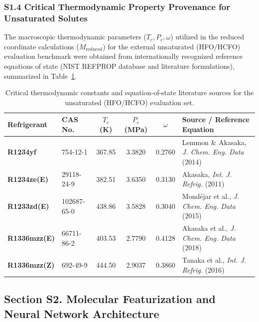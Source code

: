 \subsubsection*{S1.4 Critical Thermodynamic Property Provenance for Unsaturated Solutes}
The macroscopic thermodynamic parameters ($T_c, P_c, \omega$) utilized in the reduced coordinate calculations ($M_{\mathrm{reduced}}$) for the external unsaturated (HFO/HCFO) evaluation benchmark were obtained from internationally recognized reference equations of state (NIST REFPROP database and literature formulations), summarized in Table~\ref{tab:si_hfo_critical}.

\begin{table}[htbp]
\centering
\small
\caption{Critical thermodynamic constants and equation-of-state literature sources for the unsaturated (HFO/HCFO) evaluation set.}
\label{tab:si_hfo_critical}
\begin{tabular}{llcccl}
\toprule
\textbf{Refrigerant} & \textbf{CAS No.} & \textbf{$T_c$ (K)} & \textbf{$P_c$ (MPa)} & \textbf{$\omega$} & \textbf{Source / Reference Equation} \\
\midrule
\textbf{R1234yf} & 754-12-1 & 367.85 & 3.3820 & 0.2760 & Lemmon \& Akasaka, \textit{J. Chem. Eng. Data} (2014) \\
\textbf{R1234ze(E)} & 29118-24-9 & 382.51 & 3.6350 & 0.3130 & Akasaka, \textit{Int. J. Refrig.} (2011) \\
\textbf{R1233zd(E)} & 102687-65-0 & 438.86 & 3.5828 & 0.3040 & Mondéjar et al., \textit{J. Chem. Eng. Data} (2015) \\
\textbf{R1336mzz(E)} & 66711-86-2 & 403.53 & 2.7790 & 0.4128 & Akasaka et al., \textit{J. Chem. Eng. Data} (2018) \\
\textbf{R1336mzz(Z)} & 692-49-9 & 444.50 & 2.9037 & 0.3860 & Tanaka et al., \textit{Int. J. Refrig.} (2016) \\
\bottomrule
\end{tabular}
\end{table}

\subsection*{Section S2. Molecular Featurization and Neural Network Architecture}

